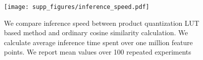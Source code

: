 \begin{figure}[h!]
    \centering
        \texttt{[image: supp\_figures/inference\_speed.pdf]}
    \caption{We compare inference speed between product quantization LUT based method and ordinary cosine similarity calculation. We calculate average inference time spent over one million feature points. We report mean values over 100 repeated experiments}
    \vspace{-3mm}
    \label{fig:inf_speed}
\end{figure}